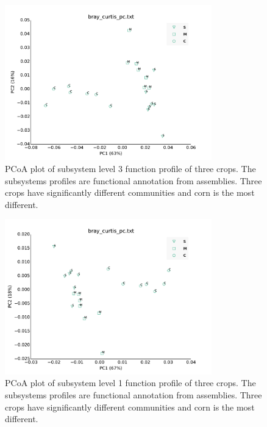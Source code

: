 \documentclass[12pt]{article}
\begin{document}
    \begin{figure}[tbph!]
    \centering
    \includegraphics[width=0.8\textwidth]{figures/subsys-l3-pcoa}
    \caption[PCoA plot based on subsystem profile]{PCoA plot of subsystem level 3 function profile of three crops. The subsystems profiles are functional annotation from assemblies. Three crops have significantly different communities and corn is the most different.}
    \label{fig:subsys-l3-pcoa}
    \end{figure}

    \begin{figure}[tbph!]
    \centering
    \includegraphics[width=0.8\textwidth]{figures/subsys-l1-pcoa}
    \caption[PCoA plot based on subsystem profile]{PCoA plot of subsystem level 1 function profile of three crops. The subsystems profiles are functional annotation from assemblies. Three crops have significantly different communities and corn is the most different.}
    \label{fig:subsys-l1-pcoa}
    \end{figure}
\end{document}
